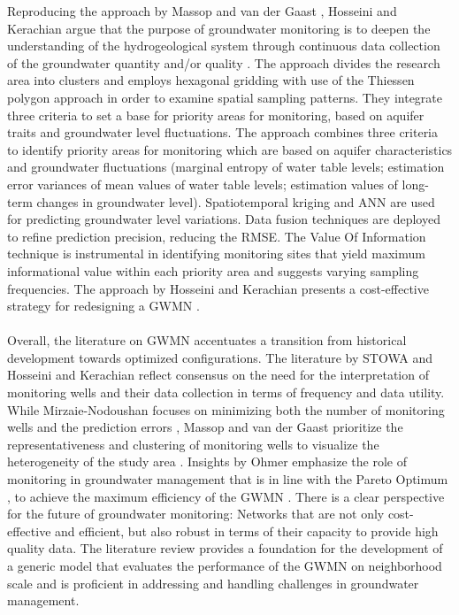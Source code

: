 Reproducing the approach by Massop and van der Gaast \cite{massop-2003}, Hosseini and Kerachian argue that the purpose of groundwater monitoring is to deepen the understanding of the hydrogeological system through continuous data collection of the groundwater quantity and/or quality \cite{hosseini-2017}. The approach divides the research area into clusters and employs hexagonal gridding with use of the Thiessen polygon approach in order to examine spatial sampling patterns. They integrate three criteria to set a base for priority areas for monitoring, based on aquifer traits and groundwater level fluctuations. The approach combines three criteria to identify priority areas for monitoring which are based on aquifer characteristics and groundwater fluctuations (marginal entropy of water table levels; estimation error variances of mean values of water table levels; estimation values of long-term changes in groundwater level). Spatiotemporal kriging and ANN are used for predicting groundwater level variations. Data fusion techniques are deployed to refine prediction precision, reducing the RMSE. The Value Of Information technique is instrumental in identifying monitoring sites that yield maximum informational value within each priority area and suggests varying sampling frequencies. The approach by Hosseini and Kerachian presents a cost-effective strategy for redesigning a GWMN \cite{hosseini-2017}.\\
\\
Overall, the literature on GWMN accentuates a transition from historical development towards optimized configurations. The literature by STOWA \cite{stowa-1998} and Hosseini and Kerachian \cite{hosseini-2017} reflect consensus on the need for the interpretation of monitoring wells and their data collection in terms of frequency and data utility. While Mirzaie-Nodoushan focuses on minimizing both the number of monitoring wells and the prediction errors \cite{mirzaie-nodoushan-2017}, Massop and van der Gaast prioritize the representativeness and clustering of monitoring wells to visualize the heterogeneity of the study area \cite{massop-2003}. Insights by Ohmer emphasize the role of monitoring in groundwater management that is in line with the Pareto Optimum \cite{ohmer-2019}, to achieve the maximum efficiency of the GWMN \cite{smith-2013}. There is a clear perspective for the future of groundwater monitoring: Networks that are not only cost-effective and efficient, but also robust in terms of their capacity to provide high quality data. The literature review provides a foundation for the development of a generic model that evaluates the performance of the GWMN on neighborhood scale and is proficient in addressing and handling challenges in groundwater management. 











